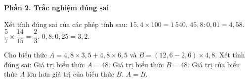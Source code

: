 \textbf{Phần 2. Trắc nghiệm đúng sai}

\begin{ex} %
Xét tính đúng sai của các phép tính sau:
\choiceTF
{\True $15{,}4 \times 100 = 1\,540$.}
{$45{,}8 : 0{,}01 = 4{,}58$.}
{\True $\dfrac{5}{7} \times \dfrac{14}{15} = \dfrac{2}{3}$.}
{\True $0{,}8 : 0{,}25 = 3{,}2$.}
\end{ex}

\begin{ex} %
Cho biểu thức $A = 4{,}8 \times 3{,}5 + 4{,}8 \times 6{,}5$ và $B = (12{,}6 - 2{,}6) \times 4{,}8$. Xét tính đúng sai:
\choiceTF
{\True Giá trị biểu thức $A = 48$.}
{\True Giá trị biểu thức $B = 48$.}
{Giá trị của biểu thức $A$ lớn hơn giá trị của biểu thức $B$.}
{\True $A = B$.}
\end{ex}

